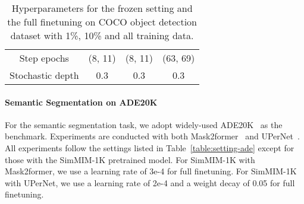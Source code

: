 \documentclass{article}
\begin{document}
\begin{table}[h]
\begin{tabular}{c|cc|cc|cc}
    Step epochs & \multicolumn{2}{c|}{(8, 11)} & \multicolumn{2}{c|}{(8, 11)} & \multicolumn{2}{c}{(63, 69)} \\
    Stochastic depth & \multicolumn{2}{c|}{0.3} & \multicolumn{2}{c|}{0.3} & \multicolumn{2}{c}{0.3} \\
    \bottomrule
    \end{tabular}
    \vspace{0.5em}
    \caption{Hyperparameters for the frozen setting and the full finetuning on COCO object detection dataset with 1\%, 10\% and all training data.}
    \label{table:setting-coco}
\end{table}


\paragraph{Semantic Segmentation on ADE20K}

For the semantic segmentation task, we adopt widely-used ADE20K~\cite{zhou2018ade} as the benchmark. Experiments are conducted with both Mask2former~\cite{mask2former} and UPerNet~\cite{xiao2018upernet}. All experiments follow the settings listed in Table~\ref{table:setting-ade} except for those with the SimMIM-1K pretrained model. For SimMIM-1K with Mask2former, we use a learning rate of 3e-4 for full finetuning. For SimMIM-1K with UPerNet, we use a learning rate of 2e-4 and a weight decay of 0.05 for full finetuning.  
\end{document}
